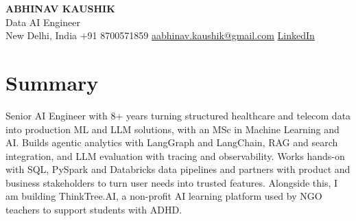 \documentclass[10pt,a4paper]{article}
\begin{document}
\begin{center}
  {\LARGE\bfseries ABHINAV KAUSHIK}\\[2pt]
  {\large Data AI Engineer}\\[2pt]
  New Delhi, India \textbar{} +91 8700571859 \textbar{} \href{mailto:aabhinav.kaushik@gmail.com}{aabhinav.kaushik@gmail.com} \textbar{} \href{https://www.linkedin.com/in/abhinav-kaushik10/}{LinkedIn}  
\end{center}

\section{Summary}
Senior AI Engineer with 8+ years turning structured healthcare and telecom data into production ML and LLM solutions, with an MSc in Machine Learning and AI. Builds agentic analytics with LangGraph and LangChain, RAG and search integration, and LLM evaluation with tracing and observability. Works hands-on with SQL, PySpark and Databricks data pipelines and partners with product and business stakeholders to turn user needs into trusted features. Alongside this, I am building ThinkTree.AI, a non-profit AI learning platform used by NGO teachers to support students with ADHD.
\end{document}

